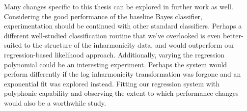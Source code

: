 \documentclass[12pt]{cmuthesis}
\begin{document}
Many changes specific to this thesis can be explored in further work as well. Considering the good performance of the baseline Bayes classifier, experimentation should be continued with other standard classifiers. Perhaps a different well-studied classification routine that we've overlooked is even better-suited to the structure of the inharmonicity data, and would outperform our regression-based likelihood approach. Additionally, varying the regression polynomial could be an interesting experiment. Perhaps the system would perform differently if the log inharmonicity transformation was forgone and an exponential fit was explored instead. Fitting our regression system with polyphonic capability and observing the extent to which performance changes would also be a worthwhile study.



\end{document}
